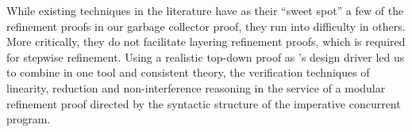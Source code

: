 While existing techniques in the literature have as their
``sweet spot'' a few of the refinement proofs in our garbage collector
proof, they run into difficulty in others. 
More critically, they
do not facilitate layering refinement proofs, which is required for stepwise
refinement. 
Using a realistic top-down proof as \civl's design driver led us to
combine in one tool and consistent theory, the verification techniques
of linearity, reduction and non-interference reasoning in the service
of a modular refinement proof directed by the syntactic structure of
the imperative concurrent program. 


